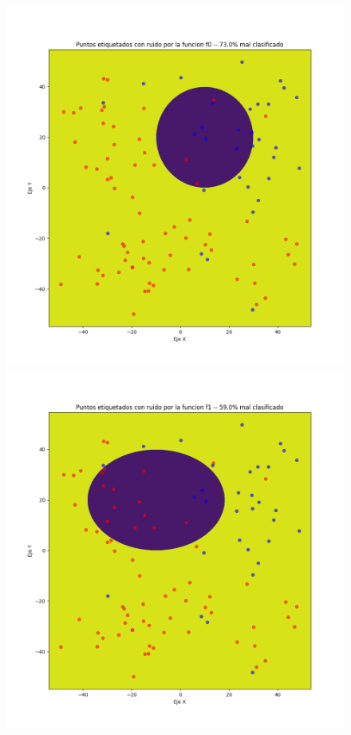 \documentclass[11pt]{article}
\begin{document}
\begin{figure}[H]
    \includegraphics[width=0.60 \textwidth]{puntos_clasificados_f0.png}
    \includegraphics[width=0.60 \textwidth]{puntos_clasificados_f1.png}


\end{figure}
\end{document}
